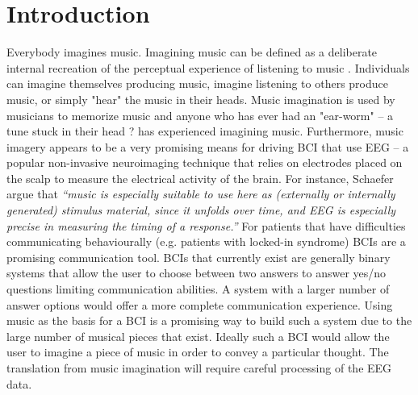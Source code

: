 \section*{Introduction}

Everybody imagines music. Imagining music can be defined as a deliberate internal recreation of the perceptual experience of listening to music \cite{Schaefer2011}.
Individuals can imagine themselves producing music, imagine listening to others produce music, or simply "hear" the music in their heads. 
Music imagination is used by musicians to memorize music and anyone who has ever had an "ear-worm" -- a tune stuck in their head ? has experienced imagining music.
Furthermore, music imagery appears to be a very promising means for driving \ac{BCI} that use \ac{EEG} -- a popular non-invasive neuroimaging technique that relies on electrodes placed on the scalp to measure the electrical activity of the brain.
For instance, Schaefer \etal\cite{schaefer_measuring_2011} argue that
\emph{``music is especially suitable to use here as (externally or internally generated) stimulus material, since it unfolds over time, and \ac{EEG} is especially precise in measuring the timing of a response.''}
For patients that have difficulties communicating behaviourally (e.g. patients with locked-in syndrome) \ac{BCI}s are a promising communication tool. 
{BCI}s that currently exist are generally binary systems that allow the user to choose between two answers to answer yes/no questions limiting communication abilities. 
A system with a larger number of answer options would offer a more complete communication experience. 
Using music as the basis for a \ac{BCI} is a promising way to build such a system due to the large number of musical pieces that exist. 
Ideally such a \ac{BCI} would allow the user to imagine a piece of music in order to convey a particular thought. 
The translation from music imagination will require careful processing of the EEG data. 

